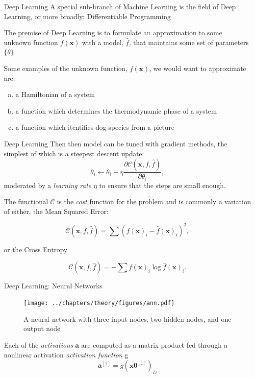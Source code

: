 \documentclass{beamer}
\begin{document}
\begin{frame}[t]{Deep Learning}
	A special sub-branch of Machine Learning is the field of Deep Learning, or more broadly: Differentiable Programming

	The premise of Deep Learning is to formulate an approximation to some unknown function $f(\mathbf{x})$ with a model, $\hat{f}$, that maintains some set of parameters $\{\theta\}$. 

	Some examples of the unknown function, $f(\mathbf{x})$, we would want to approximate are:
	\begin{enumerate}[(a)]
		\item a Hamiltonian of a system 
		\item a function which determines the thermodynamic phase of a system
		\item a function which itentifies dog-species from a picture
	\end{enumerate}
\end{frame}

\begin{frame}[t]{Deep Learning}
	Then then model can be tuned with gradient methods, the simplest of which is a steepest descent update: 
	\begin{equation}
		\theta_i \leftarrow \theta_i - \eta \frac{\partial \mathcal{C}(\mathbf{x}, f, \hat{f})}{\partial \theta_i},
	\end{equation}
	moderated by a \textit{learning rate} $\eta$ to ensure that the steps are small enough.

	The functional $\mathcal{C}$ is the \textit{cost} function for the problem and is commonly a variation of either, the Mean Squared Error: 

	\begin{equation}
		\mathcal{C}(\mathbf{x}, f, \hat{f}) = \sum (f(\mathbf{x})_i - \hat{f}(\mathbf{x})_i)^2,
	\end{equation}

	or the Cross Entropy

	\begin{equation}
		\mathcal{C}(\mathbf{x}, f, \hat{f}) = -\sum f(\mathbf{x})_i \log \hat{f}(\mathbf{x})_i. 
	\end{equation}
\end{frame}

\begin{frame}[t]{Deep Learning: Neural Networks}
	\begin{figure}[h]
		\centering
		\texttt{[image: ../chapters/theory/figures/ann.pdf]}
		\caption{A neural network with three input nodes, two hidden nodes, and one output node}
		\label{fig:ann}
	\end{figure}
	Each of the \textit{activations} $\mathbf{a}$ are computed as a matrix product fed through a nonlinear activation \textit{activation function} g
	\begin{equation}\label{eq:fwd}
		\boldsymbol{a}^{[1]} = g(\boldsymbol{x}\boldsymbol{\theta}^{[1]})_D
	\end{equation}
\end{frame}
\end{document}
